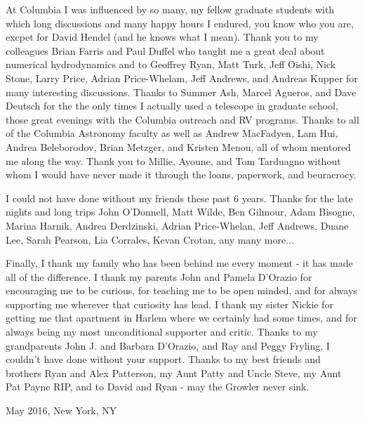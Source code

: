 At Columbia I was influenced by so many, my fellow graduate students with
which long discussions and many happy hours I endured, you know who you are, excpet for David Hendel (and he knows what I mean). %
Thank you to my colleagues Brian Farris and Paul Duffel who taught me a great
deal about numerical hydrodynamics and to Geoffrey Ryan, Matt Turk, Jeff
Oishi, Nick Stone, Larry Price, Adrian Price-Whelam, Jeff Andrews, and Andreas
Kupper for many interesting discussions. Thanks to Summer Ash, Marcel Agueros,
and Dave Deutsch for the the only times I actually used a telescope in
graduate school, those great evenings with the Columbia outreach and RV
programs. Thanks to all of the Columbia Astronomy faculty as well as Andrew
MacFadyen, Lam Hui, Andrea Beleborodov, Brian Metzger, and Kristen Menou, all
of whom mentored me along the way. Thank you to Millie, Ayoune, and Tom
Tarduagno without whom I would have never made it through the loans,
paperwork, and beuracrocy.

I could not have done without my friends these past 6 years. Thanks for the
late nights and long trips John O'Donnell, Matt Wilde, Ben Gilmour, Adam
Bisogne, Marina Harnik, Andrea Derdzinski, Adrian Price-Whelan, Jeff Andrews, Duane Lee, Sarah Pearson, Lia Corrales, Kevan Crotan, any many more...

Finally, I thank my family who has been behind me every moment - it has made
all of the difference. I thank my parents John and Pamela D'Orazio for
encouraging me to be curious, for teaching me to be open minded, and for
always supporting me wherever that curiosity has lead. I thank my sister
Nickie for getting me that apartment in Harlem where we certainly had some
times, and for always being my most unconditional supporter and critic. Thanks
to my grandparents John J. and Barbara D'Orazio, and Ray and Peggy Fryling, I
couldn't have done without your support. Thanks to my best friends and
brothers Ryan and Alex Patterson, my Aunt Patty and Uncle Steve, my
Aunt Pat Payne RIP, and to David and Ryan - may the Growler never sink.




















\vspace{0.5cm}
May 2016, New York, NY


